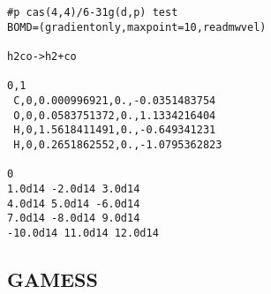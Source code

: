 \documentclass[slidestop,mathserif,compress,xcolor=svgnames]{beamer}
\newenvironment{eblock}[0]
{
\begin{beamerboxesrounded}[upper=uppercol2,lower=lowercol2,shadow=true]}
{\end{beamerboxesrounded}}
\begin{document}
\begin{frame}
\begin{eblock}{}
{\begin{verbatim}
#p cas(4,4)/6-31g(d,p) test
BOMD=(gradientonly,maxpoint=10,readmwvel)

h2co->h2+co

0,1
 C,0,0.000996921,0.,-0.0351483754
 O,0,0.0583751372,0.,1.1334216404
 H,0,1.5618411491,0.,-0.649341231
 H,0,0.2651862552,0.,-1.0795362823

0
1.0d14 -2.0d14 3.0d14
4.0d14 5.0d14 -6.0d14
7.0d14 -8.0d14 9.0d14
-10.0d14 11.0d14 12.0d14

      \end{verbatim}
    }
  \end{eblock}
\end{frame}

\subsection{GAMESS}
\end{document}
